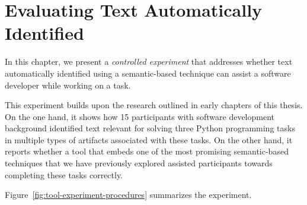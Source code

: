 \setcounter{chapter}{5}
\setcounter{rq}{1}


\chapter{Evaluating Text Automatically Identified}
\label{ch:assisting}




In this chapter, we present a \textit{controlled experiment} that addresses 
whether  text automatically identified using a semantic-based
technique can assist a software developer while working on a task.


This experiment builds upon the research outlined in early chapters of this thesis. On the one hand, it shows how 15 participants with software development background identified text relevant for solving three Python programming tasks in multiple types of artifacts associated with these tasks. On the other hand, it reports whether a tool that embeds one of the most promising semantic-based techniques that we have previously explored assisted participants towards completing these tasks correctly.







Figure~\ref{fig:tool-experiment-procedures} summarizes the experiment.















